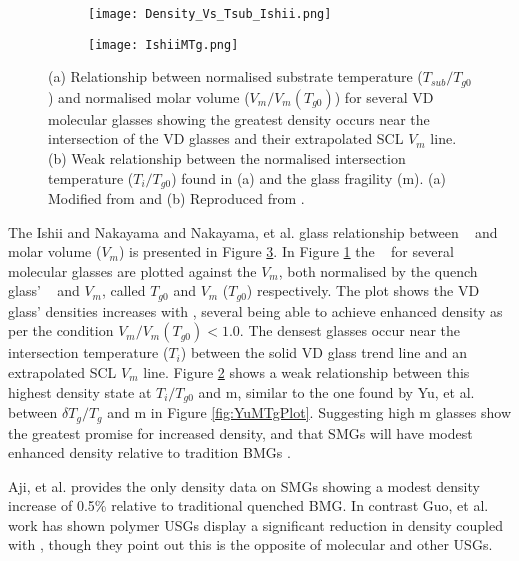 \documentclass[draft,a4paper,12pt,oneside]{report}%
\begin{document}
\begin{figure}[bp]
	\centering
	\begin{subfigure}[htbp]{0.75\textwidth}
		\texttt{[image: Density\_Vs\_Tsub\_Ishii.png]}
		\caption{}
		\label{fig:IshiiDensityTsub}
	\end{subfigure}
	\begin{subfigure}[htbp]{0.75\textwidth}
		\texttt{[image: IshiiMTg.png]}
		\caption{}
		\label{fig:IshiiMTg}
	\end{subfigure}
	\caption[USG Enhanced Density]{(a) Relationship between normalised substrate temperature ($T_{sub}/T_{g0}$) and normalised molar volume ($V_{m}/V_{m} (T_{g0})$) for several VD molecular glasses showing the greatest density occurs near the intersection of the VD glasses and their extrapolated SCL $V_{m}$ line. (b) Weak relationship between the normalised intersection temperature ($T_{i}/T_{g0}$) found in (a) and the glass fragility (m). (a) Modified from \cite{Ishii2014} and (b) Reproduced from \cite{Ishii2014}.}%
	\label{fig:IshiiTsubM}
\end{figure}


The Ishii and Nakayama \cite{Ishii2014} and Nakayama, et al. \cite{Nakayama2013} glass relationship between \Tsub~ and molar volume ($V_{m}$) is presented in Figure \ref{fig:IshiiTsubM}. In Figure \ref{fig:IshiiDensityTsub} the \Tsub~ for several molecular glasses are plotted against the $V_{m}$, both normalised by the quench glass' \Tg~ and $V_{m}$, called $T_{g0}$ and $V_{m}$ ($T_{g0}$) respectively. The plot shows the VD glass' densities increases with \Tsub, several being able to achieve enhanced density as per the condition $V_{m}/V_{m} (T_{g0})<1.0$. The densest glasses occur near the intersection temperature ($T_{i}$) between the solid VD glass trend line and an extrapolated SCL $V_{m}$ line. Figure \ref{fig:IshiiMTg} shows a weak relationship between this highest density state at $T_{i}/T_{g0}$ and m, similar to the one found by Yu, et al. \cite{Yu2013} between $\delta T_{g}/T_{g}$ and m in Figure \ref{fig:YuMTgPlot}. Suggesting high m glasses show the greatest promise for increased density, and that SMGs will have modest enhanced density relative to tradition BMGs \cite{Ishii2014, Nakayama2013}.  

Aji, et al. \cite{Aji2013} provides the only density data on SMGs showing a modest density increase of 0.5\% relative to traditional quenched BMG. In contrast Guo, et al. \cite{Guo2012} work has shown polymer USGs display a significant reduction in density coupled with \dTg, though they point out this is the opposite of molecular and other USGs. 
\end{document}
